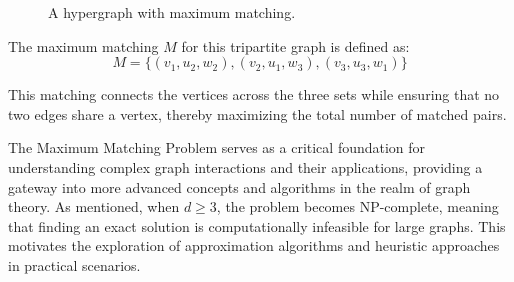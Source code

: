 \begin{figure}[t]
\centering
{}
\caption{A hypergraph with maximum matching.}
\label{fig:tripartite_graph}
\end{figure}

The maximum matching \( M \) for this tripartite graph is defined as:
\[M = \{ (v_1, u_2, w_2), (v_2, u_1, w_3), (v_3, u_3, w_1) \}\]

This matching connects the vertices across the three sets while ensuring that no two edges share a vertex, thereby maximizing the total number of matched pairs.



The Maximum Matching Problem serves as a critical foundation for understanding complex graph interactions and their applications, providing a gateway into more advanced concepts and algorithms in the realm of graph theory. As mentioned, when \(d \geq 3\), the problem becomes NP-complete, meaning that finding an exact solution is computationally infeasible for large graphs. This motivates the exploration of approximation algorithms and heuristic approaches in practical scenarios.


